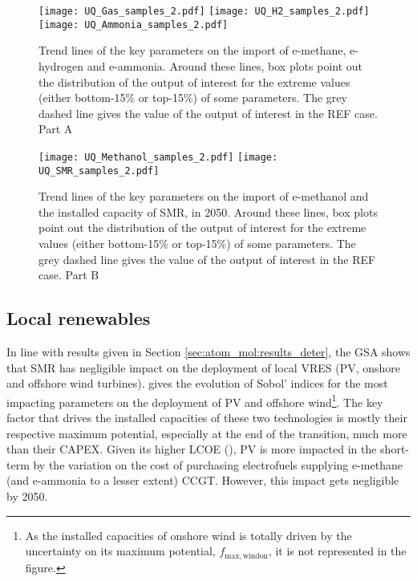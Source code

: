 \begin{figure}[htbp!]
\centering
\texttt{[image: UQ\_Gas\_samples\_2.pdf]}
\texttt{[image: UQ\_H2\_samples\_2.pdf]}
\texttt{[image: UQ\_Ammonia\_samples\_2.pdf]}

\caption{Trend lines of the key parameters on the import of e-methane, e-hydrogen and e-ammonia. Around these lines, box plots point out the distribution of the output of interest for the extreme values (either bottom-15\% or top-15\%) of some parameters. The grey dashed line gives the value of the output of interest in the REF case. Part A}
\label{fig:results_uq_samples_A}
\end{figure}

\begin{figure}[htbp!]
\centering
\texttt{[image: UQ\_Methanol\_samples\_2.pdf]}
\texttt{[image: UQ\_SMR\_samples\_2.pdf]}
\caption{Trend lines of the key parameters on the import of e-methanol and the installed capacity of \gls{SMR}, in 2050. Around these lines, box plots point out the distribution of the output of interest for the extreme values (either bottom-15\% or top-15\%) of some parameters. The grey dashed line gives the value of the output of interest in the REF case. Part B}
\label{fig:results_uq_samples_B}
\end{figure}

\subsection{Local renewables}
\label{subsec:atom_mol:results_uq_VRES}
In line with results given in Section \ref{sec:atom_mol:results_deter}, the \gls{GSA} shows that \gls{SMR} has negligible impact on the deployment of local \gls{VRES} (\ie \gls{PV}, onshore and offshore wind turbines).  gives the evolution of Sobol' indices for the most impacting parameters on the deployment of \gls{PV} and offshore wind\footnote{As the installed capacities of onshore wind is totally driven by the uncertainty on its maximum potential, $f_{\mathrm{max,windon}}$, it is not represented in the figure.}. The key factor that drives the installed capacities of these two technologies is mostly their respective maximum potential, especially at the end of the transition, much more than their CAPEX. Given its higher \gls{LCOE} (), \gls{PV} is more impacted in the short-term by the variation on the cost of purchasing electrofuels supplying e-methane (and e-ammonia to a lesser extent) \gls{CCGT}. However, this impact gets negligible by 2050.

